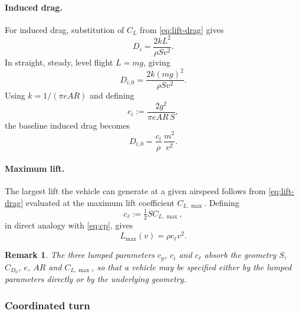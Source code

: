 \documentclass[11pt,a4paper]{article}
\newtheorem{remark}{Remark}
\begin{document}
\paragraph{Induced drag.}
For induced drag, substitution of $C_L$ from \cref{eq:lift-drag} gives
\begin{equation}
  D_i = \frac{2kL^{2}}{\rho S v^{2}} .
\end{equation}
In straight, steady, level flight $L = mg$, giving
\begin{equation}
  D_{i,0} = \frac{2k(mg)^{2}}{\rho S v^{2}} .
\end{equation}
Using $k = 1/(\pi e AR)$ and defining
\begin{equation}
  c_i := \frac{2g^{2}}{\pi e AR\, S},
  \label{eq:ci}
\end{equation}
the baseline induced drag becomes
\begin{equation}
  D_{i,0} = \frac{c_i}{\rho}\,\frac{m^{2}}{v^{2}} .
\end{equation}

\paragraph{Maximum lift.}
The largest lift the vehicle can generate at a given airspeed follows from
\cref{eq:lift-drag} evaluated at the maximum lift coefficient $C_{L,\max}$.
Defining
\begin{equation}
  c_\ell := \tfrac{1}{2} S C_{L,\max},
  \label{eq:cl}
\end{equation}
in direct analogy with \cref{eq:cp}, gives
\begin{equation}
  L_{\max}(v) = \rho c_\ell v^{2} .
  \label{eq:lmax}
\end{equation}

\begin{remark}
The three lumped parameters $c_p$, $c_i$ and $c_\ell$ absorb the geometry
$S$, $C_{D_0}$, $e$, $AR$ and $C_{L,\max}$, so that a vehicle may be specified
either by the lumped parameters directly or by the underlying geometry.
\end{remark}

\subsubsection{Coordinated turn}
\end{document}

